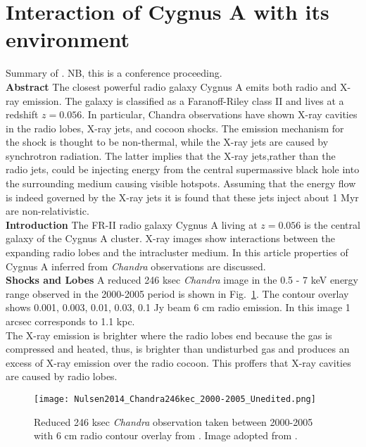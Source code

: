 \documentclass[MScProj_TLRH_ClusterEnergy.tex]{subfiles}
\begin{document}
\section*{Interaction of Cygnus A with its environment}
\label{sec:nulsen2014}
Summary of \citep{2015IAUS..313..236N}. NB, this is a conference proceeding.
\\
\textbf{Abstract}
The closest powerful radio galaxy Cygnus A emits both radio and X-ray emission. The galaxy is classified as a Faranoff-Riley class II and lives at a redshift $z=0.056$. In particular, Chandra observations have shown X-ray cavities in the radio lobes, X-ray jets, and cocoon shocks. The emission mechanism for the shock is thought to be non-thermal, while the X-ray jets are caused by synchrotron radiation. The latter implies that the X-ray jets,rather than the radio jets, could be injecting energy from the central supermassive black hole into the surrounding medium causing visible hotspots. Assuming that the energy flow is indeed governed by the X-ray jets it is found that these jets inject about 1 M\Sun yr are non-relativistic.
\\
\textbf{Introduction}
The FR-II radio galaxy Cygnus A living at $z = 0.056$ is the central galaxy of the Cygnus A cluster. X-ray images show interactions between the expanding radio lobes and the intracluster medium. In this article properties of Cygnus A inferred from \emph{Chandra} observations are discussed.
\\
\textbf{Shocks and Lobes}
A reduced 246 ksec \emph{Chandra} image in the 0.5 - 7 keV energy range observed in the 2000-2005 period is shown in Fig.~\ref{fig:CygA_Chandra}. The contour overlay shows 0.001, 0.003, 0.01, 0.03, 0.1 Jy beam 6 cm radio emission. In this image 1 arcsec corresponds to 1.1 kpc.
\\
The X-ray emission is brighter where the radio lobes end because the gas is compressed and heated, thus, is brighter than undisturbed gas and produces an excess of X-ray emission over the radio cocoon. This proffers that X-ray cavities are caused by radio lobes.

\begin{figure}[h!]
\centering
\texttt{[image: Nulsen2014\_Chandra246kec\_2000-2005\_Unedited.png]}
\caption{Reduced 246 ksec \emph{Chandra} observation taken between 2000-2005 with 6 cm radio contour overlay from \citet{1984ApJ...285L..35P}. Image adopted from \citep{2015IAUS..313..236N}.}
\label{fig:CygA_Chandra}
\end{figure}
\end{document}
